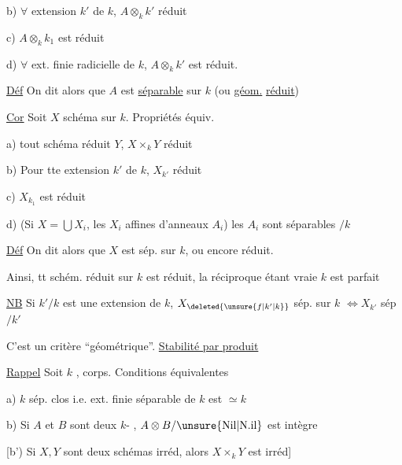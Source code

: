 b) $\forall$ extension $k'$ de $k$, $A\otimes_k k'$ réduit

c) $A\otimes_k k_1$ est réduit

d) $\forall$ ext. finie  radicielle de $k$, $A\otimes_k k'$ est réduit.


\uline{Déf} On dit alors que $A$ est \uline{séparable} sur $k$ (ou \uline{géom.} \uline{réduit})

\uline{Cor} Soit $X$ schéma sur $k$. Propriétés équiv.

a)  tout schéma réduit $Y$, $X\times_k Y$ réduit

b) Pour tte  extension $k'$ de $k$, $X_{k'}$ réduit

c) $X_{k_1}$ est réduit

 d) (Si $X=\bigcup X_i$, les $X_i$ affines  d'anneaux $A_i$) les $A_i$ sont séparables $/k$

\uline{Déf} On dit alors que $X$ est sép. sur $k$, ou encore   réduit.

Ainsi,  tt schém.  réduit sur $k$ est  réduit, la réciproque étant vraie  $k$ est parfait

\uline{NB} Si $k'/k$ est une extension de $k$, $X_{\deleted{\unsure{f|k'|k}}}$ sép. sur $k$ $\Longleftrightarrow X_{k'}$ sép $/k'$

C'est un critère ``géométrique''. \hfill\uline{Stabilité par produit}


\uline{Rappel} Soit $k$ , corps. Conditions équivalentes

a) $k$ sép. clos i.e.  ext. finie séparable de $k$ est $\simeq k$

b) Si $A$ et $B$ sont deux $k$- , $A\otimes B/\mathrm{\unsure{Nil|N.il}}$ est intègre

[b') Si $X,Y$ sont deux schémas irréd, alors $X\times_k Y$ est irréd]

